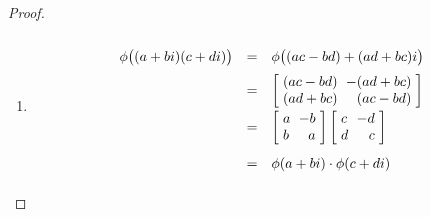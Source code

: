 \documentclass[letterpaper]{article}
\begin{document}
\begin{enumerate}
\begin{proof}
\begin{enumerate}[label=\alph*.]
	\item \[\def\arraystretch{2}
	\begin{array}{rcl}
	\phi\big((a+bi)(c+di)\big)&=&\phi\big((ac-bd)+(ad+bc)i\big)\\
	&=&
		\arraycolsep=3pt\def\arraystretch{1}
		\left[\begin{array}{lr}
		(ac-bd) & -(ad+bc) \\
		(ad+bc) & (ac-bd) \\
		\end{array} \right]
		\\
	&=&
		\arraycolsep=3pt\def\arraystretch{1}
		\left[\begin{array}{lr}
		a & -b \\
		b & a  \\
		\end{array} \right]
		\arraycolsep=3pt\def\arraystretch{1}
		\left[\begin{array}{lr}
		c & -d \\
		d & c  \\
		\end{array} \right]
		\\
	&=&\phi(a+bi)\cdot\phi(c+di)\\
	\end{array}\]
	
	\end{enumerate}
\end{proof}

\end{enumerate}
\end{document}
